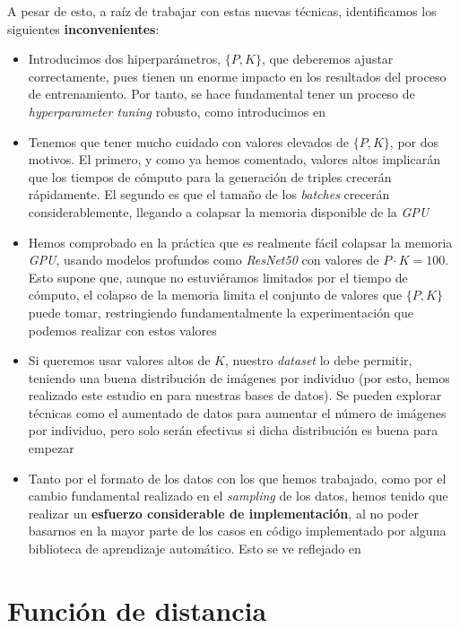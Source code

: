 A pesar de esto, a raíz de trabajar con estas nuevas técnicas, identificamos los siguientes \textbf{inconvenientes}:

\begin{itemize}
    \item Introducimos dos hiperparámetros, $\{P, K\}$, que deberemos ajustar correctamente, pues tienen un enorme impacto en los resultados del proceso de entrenamiento. Por tanto, se hace fundamental tener un proceso de \textit{hyperparameter tuning} robusto, como introducimos en 
    \item Tenemos que tener mucho cuidado con valores elevados de $\{P, K\}$, por dos motivos. El primero, y como ya hemos comentado, valores altos implicarán que los tiempos de cómputo para la generación de triples crecerán rápidamente. El segundo es que el tamaño de los \textit{batches} crecerán considerablemente, llegando a colapsar la memoria disponible de la \textit{GPU}
    \item Hemos comprobado en la práctica que es realmente fácil colapsar la memoria \textit{GPU}, usando modelos profundos como \textit{ResNet50} con valores de $P \cdot K = 100$. Esto supone que, aunque no estuviéramos limitados por el tiempo de cómputo, el colapso de la memoria limita el conjunto de valores que $\{P, K\}$ puede tomar, restringiendo fundamentalmente la experimentación que podemos realizar con estos valores
    \item Si queremos usar valores altos de $K$, nuestro \textit{dataset} lo debe permitir, teniendo una buena distribución de imágenes por individuo (por esto, hemos realizado este estudio en  para nuestras bases de datos). Se pueden explorar técnicas como el aumentado de datos para aumentar el número de imágenes por individuo, pero solo serán efectivas si dicha distribución es buena para empezar
    \item Tanto por el formato de los datos con los que hemos trabajado, como por el cambio fundamental realizado en el \textit{sampling} de los datos, hemos tenido que realizar un \textbf{esfuerzo considerable de implementación}, al no poder basarnos en la mayor parte de los casos en código implementado por alguna biblioteca de aprendizaje automático. Esto se ve reflejado en 
\end{itemize}

\section{Función de distancia}


